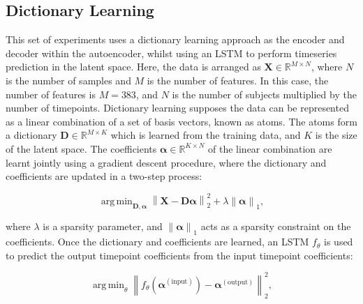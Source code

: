 \documentclass[twocolumn, 9pt]{extarticle}
\DeclareMathOperator*{\argmin}{arg\,min}
\begin{document}

\subsection{Dictionary Learning}

This set of experiments uses a dictionary learning approach as the encoder and decoder within the autoencoder, whilst using an LSTM to perform timeseries prediction in the latent space. Here, the data is arranged as $\mathbf{X} \in \mathbb{R}^{M \times N}$, where $N$ is the number of samples and $M$ is the number of features. In this case, the number of features is $M = 383$, and $N$ is the number of subjects multiplied by the number of timepoints. Dictionary learning supposes the data can be represented as a linear combination of a set of basis vectors, known as atoms. The atoms form a dictionary $\mathbf{D} \in \mathbb{R}^{M \times K}$ which is learned from the training data, and $K$ is the size of the latent space. The coefficients $\boldsymbol{\alpha} \in \mathbb{R}^{K \times N}$ of the linear combination are learnt jointly using a gradient descent procedure, where the dictionary and coefficients are updated in a two-step process:

\begin{equation}
  \argmin_{\mathbf{D}, \boldsymbol{\alpha}} \left\| \mathbf{X} - \mathbf{D} \boldsymbol{\alpha} \right\|_{2}^{2} + \lambda \left\| \boldsymbol{\alpha} \right\|_{1},
\end{equation}

\noindent where $\lambda$ is a sparsity parameter, and $\left\| \boldsymbol{\alpha} \right\|_{1}$ acts as a sparsity constraint on the coefficients. Once the dictionary and coefficients are learned, an LSTM $f_{\theta}$ is used to predict the output timepoint coefficients from the input timepoint coefficients:

\begin{equation}
  \argmin_{\theta} \left\| f_{\theta}(\boldsymbol{\alpha}^{(\mathrm{input})}) - \boldsymbol{\alpha}^{(\mathrm{output})} \right\|_{2}^{2},
\end{equation}
\end{document}
